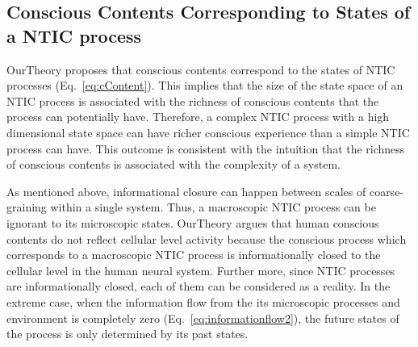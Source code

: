 \documentclass[utf8]{article}
\begin{document}
            
    	   
            	   
    			
		\subsection{Conscious Contents Corresponding to States of a NTIC process}\label{sec:cc}
    		\ac{OurTheory} proposes that conscious contents correspond to the states of NTIC processes (Eq.~\ref{eq:cContent}). This implies that the size of the state space of an NTIC process is associated with the richness of conscious contents that the process can potentially have. Therefore, a complex NTIC process with a high dimensional state space can have richer conscious experience than a simple NTIC process can have. This outcome is consistent with the intuition that the richness of conscious contents is associated with the complexity of a system. 
    		
    		As mentioned above, informational closure can happen between scales of coarse-graining within a single system. Thus, a macroscopic NTIC process can be ignorant to its microscopic states. \ac{OurTheory} argues that human conscious contents do not reflect cellular level activity because the conscious process which corresponds to a macroscopic NTIC process is informationally closed to the cellular level in the human neural system. Further more, since NTIC processes are informationally closed, each of them can be considered as a reality. In the extreme case, when the information flow from the its microscopic processes and environment is completely zero (Eq.~\ref{eq:informationflow2}), the future states of the process is only determined by its past states. 
    		
\end{document}

